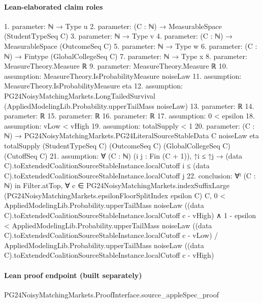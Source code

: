 \documentclass[10pt]{article}
\begin{document}
\paragraph{Lean-elaborated claim roles}\begin{ReviewVerbatim}
1. parameter: ℕ → Type u
2. parameter: (C : ℕ) → MeasurableSpace (StudentTypeSeq C)
3. parameter: ℕ → Type v
4. parameter: (C : ℕ) → MeasurableSpace (OutcomeSeq C)
5. parameter: ℕ → Type w
6. parameter: (C : ℕ) → Fintype (GlobalCollegeSeq C)
7. parameter: ℕ → Type x
8. parameter: MeasureTheory.Measure ℝ
9. parameter: MeasureTheory.Measure ℝ
10. assumption: MeasureTheory.IsProbabilityMeasure noiseLaw
11. assumption: MeasureTheory.IsProbabilityMeasure eta
12. assumption: PG24NoisyMatchingMarkets.LongTailedSurvival (AppliedModelingLib.Probability.upperTailMass noiseLaw)
13. parameter: ℝ
14. parameter: ℝ
15. parameter: ℝ
16. parameter: ℝ
17. assumption: 0 < epsilon
18. assumption: vLow < vHigh
19. assumption: totalSupply < 1
20. parameter: (C : ℕ) →
  PG24NoisyMatchingMarkets.PG24LiteralSourceStableData C noiseLaw eta totalSupply (StudentTypeSeq C) (OutcomeSeq C)
    (GlobalCollegeSeq C) (CutoffSeq C)
21. assumption: ∀ (C : ℕ) (i j : Fin (C + 1)),
  ↑i ≤ ↑j →
    (data C).toExtendedCoalitionSourceStableInstance.localCutoff i ≤
      (data C).toExtendedCoalitionSourceStableInstance.localCutoff j
22. conclusion: ∀ᶠ (C : ℕ) in Filter.atTop,
  ∀ c ∈ PG24NoisyMatchingMarkets.indexSuffixLarge (PG24NoisyMatchingMarkets.epsilonFloorSplitIndex epsilon C) C,
    0 <
        AppliedModelingLib.Probability.upperTailMass noiseLaw
          ((data C).toExtendedCoalitionSourceStableInstance.localCutoff c - vHigh) ∧
      1 - epsilon <
        AppliedModelingLib.Probability.upperTailMass noiseLaw
            ((data C).toExtendedCoalitionSourceStableInstance.localCutoff c - vLow) /
          AppliedModelingLib.Probability.upperTailMass noiseLaw
            ((data C).toExtendedCoalitionSourceStableInstance.localCutoff c - vHigh)
\end{ReviewVerbatim}

\paragraph{Lean proof endpoint (built separately)}\begin{ReviewVerbatim}
PG24NoisyMatchingMarkets.ProofInterface.source_appleSpec_proof
\end{ReviewVerbatim}
\end{document}

